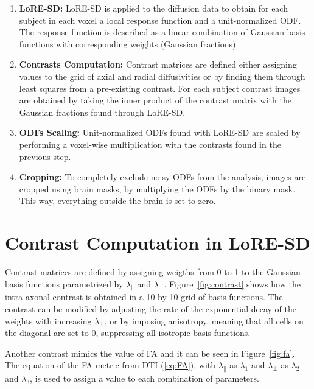 \begin{enumerate}
    \item  \textbf{LoRE-SD: } LoRE-SD is applied to the diffusion data to obtain for each subject in each voxel a local response function and a unit-normalized ODF. The response function is described as a linear combination of Gaussian basis functions with corresponding weights (Gaussian fractions).

    \item \textbf{Contrasts Computation:} Contrast matrices are defined either assigning values to the grid of axial and radial diffusivities or by finding them through least squares from a pre-existing contrast. For each subject contrast images are obtained by taking the inner product of the contrast matrix with the Gaussian fractions found through LoRE-SD.

    \item \textbf{ODFs Scaling:} Unit-normalized ODFs found with LoRE-SD are scaled by performing a voxel-wise multiplication with the contrasts found in the previous step.

    \item \textbf{Cropping:} To completely exclude noisy ODFs from the analysis, images are cropped using brain masks, by multiplying the ODFs by the binary mask. This way, everything outside the brain is set to zero.
    
\end{enumerate}

\section{Contrast Computation in LoRE-SD}
Contrast matrices are defined by assigning weigths from 0 to 1 to the Gaussian basis functions parametrized by $\lambda_{\parallel}$ and $\lambda_{\perp}$.
Figure~\ref{fig:contrast} shows how the intra-axonal contrast is obtained in a 10 by 10 grid of basis functions. The contrast can be modified by adjusting the rate of the exponential decay of the weights with increasing $\lambda_{\perp}$, or by imposing anisotropy, meaning that all cells on the diagonal are set to 0, suppressing all isotropic basis functions.

Another contrast mimics the value of FA and it can be seen in Figure~\ref{fig:fa}. The equation of the FA metric from DTI (\ref{eq:FA}), with $\lambda_{\parallel}$ as $\lambda_{1}$ and $\lambda_{\perp}$ as $\lambda_{2}$ and $\lambda_{3}$, is used to assign a value to each combination of parameters.

